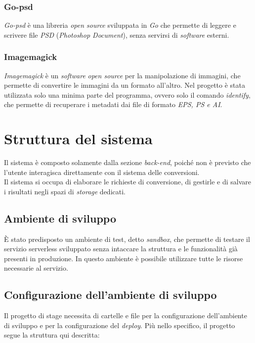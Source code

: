 \subsubsection{Go-psd}

\emph{Go-psd} è una libreria \emph{open source} sviluppata in \emph{Go} che
permette di leggere e scrivere file \emph{PSD} (\emph{Photoshop Document}),
senza servirsi di \emph{software} esterni. \cite{go-psd}

\subsubsection{Imagemagick}

\emph{Imagemagick} è un \emph{software} \emph{open source} per la manipolazione
di immagini, che permette di convertire le immagini da un formato all'altro.
Nel progetto è stata utilizzata solo una minima parte del programma, ovvero
solo il comando \emph{identify}, che permette di recuperare i metadati dai file
di formato \emph{EPS, PS e AI}. \cite{imagemagick}

\newpage
\section{Struttura del sistema}

Il sistema è composto solamente dalla sezione \emph{back-end}, poiché
non è previsto che l'utente interagisca direttamente con il sistema delle
conversioni. \\
Il sistema si occupa di elaborare le richieste di conversione, di gestirle e di
salvare i risultati negli spazi di \emph{storage} dedicati.

\subsection{Ambiente di sviluppo}

È stato predisposto un ambiente di test, detto \emph{sandbox}, che permette di
testare il servizio serverless sviluppato senza intaccare la struttura e le
funzionalità già presenti in produzione. In questo ambiente è possibile
utilizzare tutte le risorse necessarie al servizio.

\subsection{Configurazione dell'ambiente di sviluppo}

Il progetto di stage necessita di cartelle e file per la configurazione
dell'ambiente di sviluppo e per la configurazione del \emph{deploy}. Più nello
specifico, il progetto segue la struttura qui descritta:

